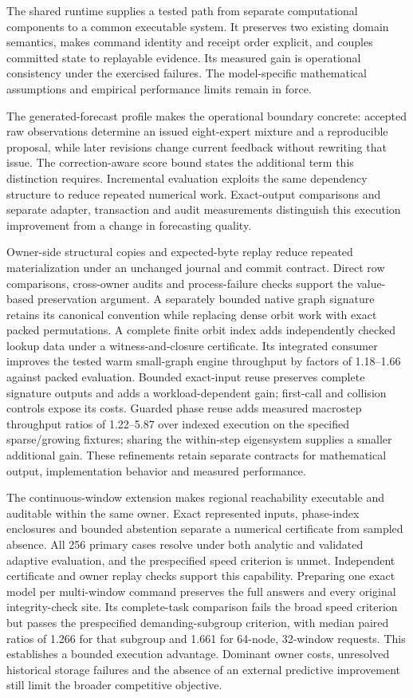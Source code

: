 \documentclass[11pt,a4paper]{article}
\theoremstyle{definition}\newtheorem{definition}[theorem]{Definition}
\begin{document}
The shared runtime supplies a tested path from separate computational components to a common executable system. It preserves two existing domain semantics, makes command identity and receipt order explicit, and couples committed state to replayable evidence. Its measured gain is operational consistency under the exercised failures. The model-specific mathematical assumptions and empirical performance limits remain in force.

The generated-forecast profile makes the operational boundary concrete: accepted raw observations determine an issued eight-expert mixture and a reproducible proposal, while later revisions change current feedback without rewriting that issue. The correction-aware score bound states the additional term this distinction requires. Incremental evaluation exploits the same dependency structure to reduce repeated numerical work. Exact-output comparisons and separate adapter, transaction and audit measurements distinguish this execution improvement from a change in forecasting quality.

Owner-side structural copies and expected-byte replay reduce repeated materialization under an unchanged journal and commit contract. Direct row comparisons, cross-owner audits and process-failure checks support the value-based preservation argument. A separately bounded native graph signature retains its canonical convention while replacing dense orbit work with exact packed permutations. A complete finite orbit index adds independently checked lookup data under a witness-and-closure certificate. Its integrated consumer improves the tested warm small-graph engine throughput by factors of 1.18--1.66 against packed evaluation. Bounded exact-input reuse preserves complete signature outputs and adds a workload-dependent gain; first-call and collision controls expose its costs. Guarded phase reuse adds measured macrostep throughput ratios of 1.22--5.87 over indexed execution on the specified sparse/growing fixtures; sharing the within-step eigensystem supplies a smaller additional gain. These refinements retain separate contracts for mathematical output, implementation behavior and measured performance.

The continuous-window extension makes regional reachability executable and auditable within the same owner. Exact represented inputs, phase-index enclosures and bounded abstention separate a numerical certificate from sampled absence. All 256 primary cases resolve under both analytic and validated adaptive evaluation, and the prespecified speed criterion is unmet. Independent certificate and owner replay checks support this capability. Preparing one exact model per multi-window command preserves the full answers and every original integrity-check site. Its complete-task comparison fails the broad speed criterion but passes the prespecified demanding-subgroup criterion, with median paired ratios of 1.266 for that subgroup and 1.661 for 64-node, 32-window requests. This establishes a bounded execution advantage. Dominant owner costs, unresolved historical storage failures and the absence of an external predictive improvement still limit the broader competitive objective.
\end{document}
